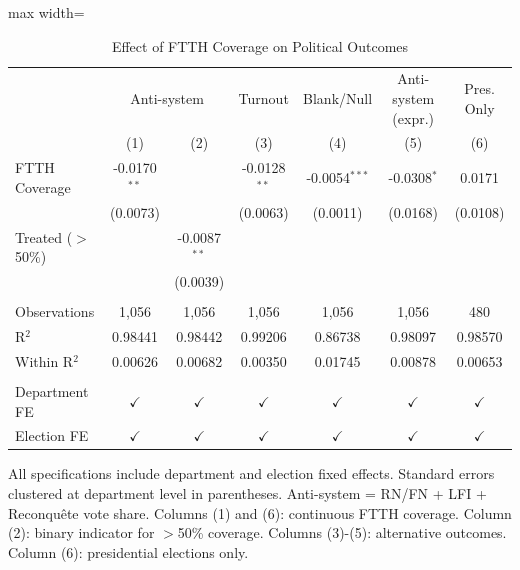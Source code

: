 
\begin{table}[htbp]
   \caption{\label{tab:main} Effect of FTTH Coverage on Political Outcomes}
   \bigskip
   \centering
   \begin{adjustbox}{max width=\textwidth}
   \begin{tabular}{lcccccc}
      \toprule
       & \multicolumn{2}{c}{Anti-system} & Turnout & Blank/Null & Anti-system (expr.) & Pres. Only \\
                                  & (1)            & (2)            & (3)            & (4)             & (5)           & (6)\\  
      \midrule 
      FTTH Coverage               & -0.0170$^{**}$ &                & -0.0128$^{**}$ & -0.0054$^{***}$ & -0.0308$^{*}$ & 0.0171\\
                                  & (0.0073)       &                & (0.0063)       & (0.0011)        & (0.0168)      & (0.0108)\\
      Treated ($>$50\%)           &                & -0.0087$^{**}$ &                &                 &               &   \\
                                  &                & (0.0039)       &                &                 &               &   \\   
       \\
      Observations                & 1,056          & 1,056          & 1,056          & 1,056           & 1,056         & 480\\  
      R$^2$                       & 0.98441        & 0.98442        & 0.99206        & 0.86738         & 0.98097       & 0.98570\\  
      Within R$^2$                & 0.00626        & 0.00682        & 0.00350        & 0.01745         & 0.00878       & 0.00653\\  
       \\
      Department FE               & $\checkmark$   & $\checkmark$   & $\checkmark$   & $\checkmark$    & $\checkmark$  & $\checkmark$\\
      Election FE                 & $\checkmark$   & $\checkmark$   & $\checkmark$   & $\checkmark$    & $\checkmark$  & $\checkmark$\\   
      \bottomrule
   \end{tabular}
   \end{adjustbox}
   
   \par \raggedright 
   All specifications include department and election fixed effects. Standard errors clustered at department level in parentheses. Anti-system = RN/FN + LFI + Reconqu\^ete vote share. Columns (1) and (6): continuous FTTH coverage. Column (2): binary indicator for $>$50\% coverage. Columns (3)-(5): alternative outcomes. Column (6): presidential elections only.
\end{table}


